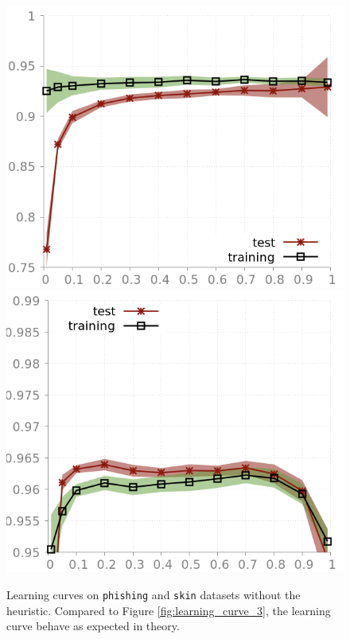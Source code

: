\documentclass[preprint,12pt]{elsarticle}
\theoremstyle{definition}
\begin{document}
\begin{figure}[!h]\centering
\includegraphics[scale=0.3]{img/learning_curve_phishing_no_heuristic.png}
\hfill
\includegraphics[scale=0.3]{img/learning_curve_skin_no_heuristic.png}
\caption{Learning curves on \texttt{phishing} and \texttt{skin} datasets without the heuristic. Compared to Figure \ref{fig:learning_curve_3}, the learning curve behave as expected in theory.}
\label{fig:learning_curve_4}
\end{figure}
\end{document}
